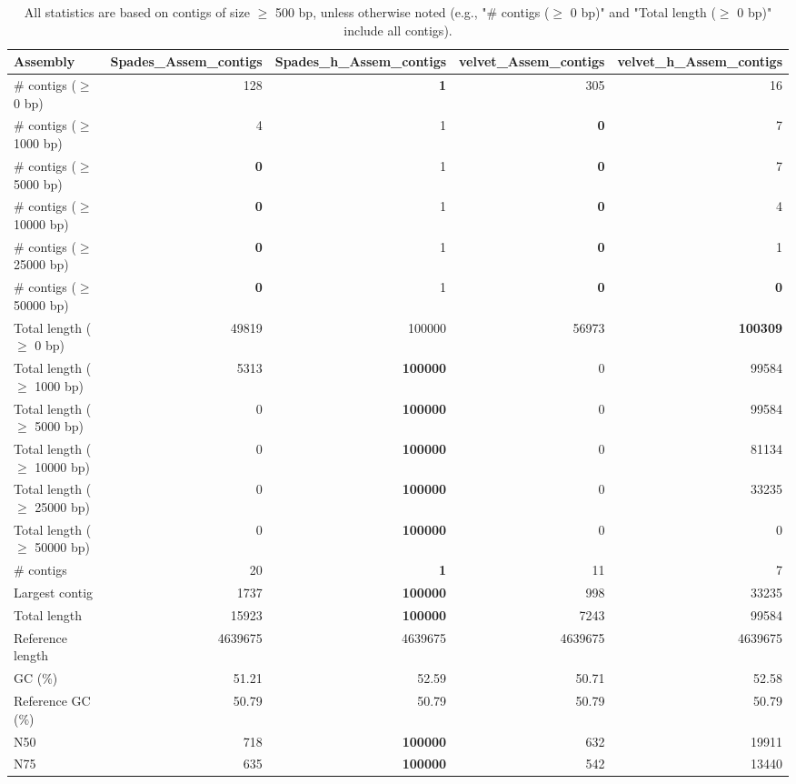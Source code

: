 \documentclass[12pt,a4paper]{article}
\begin{document}
\begin{table}[ht]
\begin{center}
\caption{All statistics are based on contigs of size $\geq$ 500 bp, unless otherwise noted (e.g., "\# contigs ($\geq$ 0 bp)" and "Total length ($\geq$ 0 bp)" include all contigs).}
\begin{tabular}{|l*{4}{|r}|}
\hline
Assembly & Spades\_Assem\_contigs & Spades\_h\_Assem\_contigs & velvet\_Assem\_contigs & velvet\_h\_Assem\_contigs \\ \hline
\# contigs ($\geq$ 0 bp) & 128 & {\bf 1} & 305 & 16 \\ \hline
\# contigs ($\geq$ 1000 bp) & 4 & 1 & {\bf 0} & 7 \\ \hline
\# contigs ($\geq$ 5000 bp) & {\bf 0} & 1 & {\bf 0} & 7 \\ \hline
\# contigs ($\geq$ 10000 bp) & {\bf 0} & 1 & {\bf 0} & 4 \\ \hline
\# contigs ($\geq$ 25000 bp) & {\bf 0} & 1 & {\bf 0} & 1 \\ \hline
\# contigs ($\geq$ 50000 bp) & {\bf 0} & 1 & {\bf 0} & {\bf 0} \\ \hline
Total length ($\geq$ 0 bp) & 49819 & 100000 & 56973 & {\bf 100309} \\ \hline
Total length ($\geq$ 1000 bp) & 5313 & {\bf 100000} & 0 & 99584 \\ \hline
Total length ($\geq$ 5000 bp) & 0 & {\bf 100000} & 0 & 99584 \\ \hline
Total length ($\geq$ 10000 bp) & 0 & {\bf 100000} & 0 & 81134 \\ \hline
Total length ($\geq$ 25000 bp) & 0 & {\bf 100000} & 0 & 33235 \\ \hline
Total length ($\geq$ 50000 bp) & 0 & {\bf 100000} & 0 & 0 \\ \hline
\# contigs & 20 & {\bf 1} & 11 & 7 \\ \hline
Largest contig & 1737 & {\bf 100000} & 998 & 33235 \\ \hline
Total length & 15923 & {\bf 100000} & 7243 & 99584 \\ \hline
Reference length & 4639675 & 4639675 & 4639675 & 4639675 \\ \hline
GC (\%) & 51.21 & 52.59 & 50.71 & 52.58 \\ \hline
Reference GC (\%) & 50.79 & 50.79 & 50.79 & 50.79 \\ \hline
N50 & 718 & {\bf 100000} & 632 & 19911 \\ \hline
N75 & 635 & {\bf 100000} & 542 & 13440 \\ \hline

\end{tabular}
\end{center}
\end{table}
\end{document}
